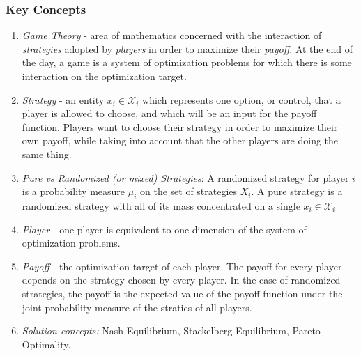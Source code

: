\subsubsection{Key Concepts}
\begin{enumerate}
    \item \textit{Game Theory} - area of mathematics concerned with the interaction of \textit{strategies} adopted by \textit{players} in order to maximize their \textit{payoff}. At the end of the day, a game is a system of optimization problems for which there is some interaction on the optimization target.
    \item \textit{Strategy} - an entity $x_i \in \mathcal{X}_i$ which represents one option, or control, that a player is allowed to choose, and which will be an input for the payoff function. Players want to choose their strategy in order to maximize their own payoff, while taking into account that the other players are doing the same thing.
    \item \textit{Pure vs Randomized (or mixed) Strategies}: A randomized strategy for player $i$ is a probability measure $\mu_i$ on the set of strategies $X_i$. A pure strategy is a randomized strategy with all of its mass concentrated on a single $x_i \in \mathcal{X}_i$%
    \item \textit{Player} - one player is equivalent to one dimension of the system of optimization problems.
    \item \textit{Payoff} - the optimization target of each player. The payoff for every player depends on the strategy chosen by every player. In the case of randomized strategies, the payoff is the expected value of the payoff function under the joint probability measure of the straties of all players.
    \item \textit{Solution concepts:} Nash Equilibrium, Stackelberg Equilibrium, Pareto Optimality.
        

\end{enumerate}
